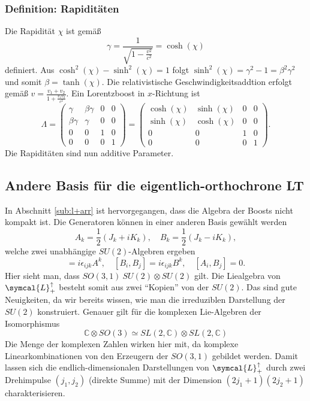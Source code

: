 \documentclass[
  captions=tableheading,  %
  titlepage=firstiscover, %
]{scrartcl}
\begin{document}
\subsubsection{Definition: Rapiditäten}
Die Rapidität $\chi$ ist gemäß 
\begin{equation*}
  \gamma = \frac{1}{\sqrt{1 - \frac{v^2}{c^2}}} = \cosh(\chi)
\end{equation*}
definiert.
Aus $\cosh^2(\chi) - \sinh^2(\chi) = 1$ folgt $\sinh^2(\chi) = \gamma^2 - 1 = \beta^2\gamma^2$ und somit 
$\beta = \tanh (\chi)$.
Die relativistische Geschwindigkeitsaddtion erfolgt gemäß 
$v = \frac{v_1 + v_2}{1 + \frac{v_1 v_2 }{c^2}}$.
Ein Lorentzboost in $x$-Richtung ist 
\begin{equation*}
  \Lambda  =
  \begin{pmatrix}
    \gamma & \beta \gamma & 0 & 0 \\
    \beta \gamma & \gamma & 0 & 0\\
    0 & 0 & 1 & 0 \\
    0 & 0 & 0 & 1
  \end{pmatrix}
  = 
  \begin{pmatrix}
    \cosh (\chi) & \sinh (\chi) & 0 & 0 \\
    \sinh (\chi) & \cosh (\chi) & 0 & 0\\
    0 & 0 & 1 & 0 \\
    0 & 0 & 0 & 1
  \end{pmatrix}
  .
\end{equation*}
Die Rapiditäten sind nun additive Parameter.
\subsection{Andere Basis für die eigentlich-orthochrone LT}
\label{sub:bas}
In Abschnitt \ref{sub:l+arr} ist hervorgegangen, dass die Algebra der Boosts nicht kompakt ist. 
Die Generatoren können in einer anderen Basis gewählt werden
\begin{equation*}
  A_k = \frac{1}{2} (J_k + i K_k), \quad B_k = \frac{1}{2} (J_k - i K_k),
\end{equation*}
welche zwei unabhängige $SU(2)$-Algebren ergeben
\begin{equation*}
  [A_i,A_j] = i \epsilon_{ijk} A^k, \quad [B_i,B_j] = i \epsilon_{ijk} B^k, \quad [A_i,B_j] = 0 \label{eqn:ka}.
\end{equation*}
Hier sieht man, dass $SO(3,1) ~ SU(2) \otimes SU(2)$ gilt.
Die Liealgebra von $\symcal{L}_+^{\uparrow}$ besteht somit aus zwei \enquote{Kopien} von 
der $SU(2)$. 
Das sind gute Neuigkeiten, da wir bereits wissen, wie man die irreduziblen Darstellung der 
$SU(2)$ konstruiert.
Genauer gilt für die komplexen Lie-Algebren der Isomorphismus 
\begin{equation*}
  \mathbb{C} \otimes SO(3) \simeq SL(2,\mathbb{C}) \otimes SL(2,\mathbb{C})
\end{equation*}
Die Menge der komplexen Zahlen wirken hier mit, da komplexe Linearkombinationen von den Erzeugern der $SO(3,1)$ gebildet werden.
Damit lassen sich die endlich-dimensionalen Darstellungen von $\symcal{L}_+^{\uparrow}$ durch zwei Drehimpulse
$(j_1, j_2)$ (direkte Summe) mit der Dimension $(2j_1 + 1)(2j_2 + 1)$ charakterisieren.
\end{document}
